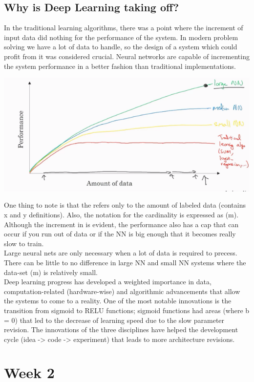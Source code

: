 \documentclass[11pt]{report}
\begin{document}
\subsection*{Why is Deep Learning taking off?}
In the traditional learning algorithms, there was a point where the increment of input data did nothing for the performance of the system. In modern problem solving we have a lot of data to handle, so the design of a system which could profit from it was considered crucial. Neural networks are capable of incrementing the system performance in a better fashion than traditional implementations. 
\begin{center}
	\includegraphics[width = .50\textwidth]{PRGR.png}
\end{center}
One thing to note is that the  refers only to the amount of labeled data (contains x and y definitions). Also, the notation for the cardinality is expressed as (m).\\
Although the increment in  is evident, the performance also has a cap that can occur if you run out of data or if the NN is big enough that it becomes really slow to train.\\
Large neural nets are only necessary when a lot of data is required to precess. There can be little to no difference in large NN and small NN systems where the data-set (m) is relatively small.\\
Deep learning progress has developed a weighted importance in data, computation-related (hardware-wise) and algorithmic advancements that allow the systems to come to a reality. One of the most notable innovations is the transition from sigmoid to RELU functions; sigmoid functions had areas (where b = 0) that led to the decrease of learning speed due to the slow parameter revision. The innovations of the three disciplines have helped the development cycle (idea -> code -> experiment) that leads to more architecture revisions.

\section{Week 2}
\end{document}
